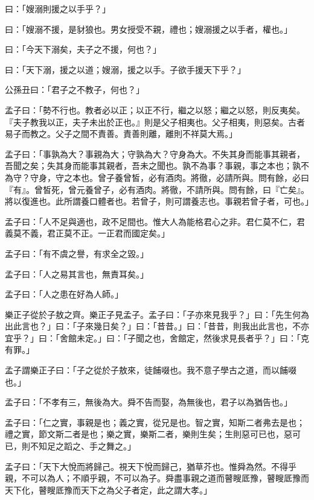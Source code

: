\documentclass[12pt,a4paper]{ctexbook}
\begin{document}
曰：「嫂溺則援之以手乎？」\par
曰：「嫂溺不援，是豺狼也。男女授受不親，禮也；嫂溺援之以手者，權也。」\par
曰：「今天下溺矣，夫子之不援，何也？」\par
曰：「天下溺，援之以道；嫂溺，援之以手。子欲手援天下乎？」\par
公孫丑曰：「君子之不教子，何也？」\par
孟子曰：「勢不行也。教者必以正；以正不行，繼之以怒；繼之以怒，則反夷矣。『夫子教我以正，夫子未出於正也。』則是父子相夷也。父子相夷，則惡矣。古者易子而教之。父子之間不責善。責善則離，離則不祥莫大焉。」\par
孟子曰：「事孰為大？事親為大；守孰為大？守身為大。不失其身而能事其親者，吾聞之矣；失其身而能事其親者，吾未之聞也。孰不為事？事親，事之本也；孰不為守？守身，守之本也。曾子養曾皙，必有酒肉。將徹，必請所與。問有餘，必曰『有』。曾皙死，曾元養曾子，必有酒肉。將徹，不請所與。問有餘，曰『亡矣』。將以復進也。此所謂養口體者也。若曾子，則可謂養志也。事親若曾子者，可也。」\par
孟子曰：「人不足與適也，政不足間也。惟大人為能格君心之非。君仁莫不仁，君義莫不義，君正莫不正。一正君而國定矣。」\par
孟子曰：「有不虞之譽，有求全之毀。」\par
孟子曰：「人之易其言也，無責耳矣。」\par
孟子曰：「人之患在好為人師。」\par
樂正子從於子敖之齊。樂正子見孟子。孟子曰：「子亦來見我乎？」曰：「先生何為出此言也？」曰：「子來幾日矣？」曰：「昔昔。」曰：「昔昔，則我出此言也，不亦宜乎？」曰：「舍館未定。」曰：「子聞之也，舍館定，然後求見長者乎？」曰：「克有罪。」\par
孟子謂樂正子曰：「子之從於子敖來，徒餔啜也。我不意子學古之道，而以餔啜也。」\par
孟子曰：「不孝有三，無後為大。舜不告而娶，為無後也，君子以為猶告也。」\par
孟子曰：「仁之實，事親是也；義之實，從兄是也。智之實，知斯二者弗去是也；禮之實，節文斯二者是也；樂之實，樂斯二者，樂則生矣；生則惡可已也，惡可已，則不知足之蹈之、手之舞之。」\par
孟子曰：「天下大悅而將歸己。視天下悅而歸己，猶草芥也。惟舜為然。不得乎親，不可以為人；不順乎親，不可以為子。舜盡事親之道而瞽瞍厎豫，瞽瞍厎豫而天下化，瞽瞍厎豫而天下之為父子者定，此之謂大孝。」\par
\end{document}
